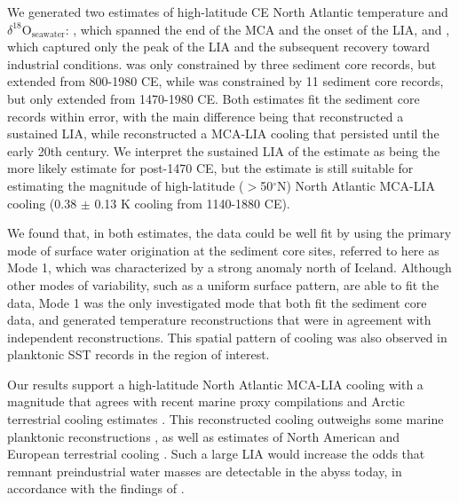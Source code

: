 \documentclass[draft]{agujournal2019}
\begin{document}
We generated two estimates of high-latitude CE North Atlantic temperature
and $\delta^{18}\mathrm{O}_{\mathrm{seawater}}$: , which
spanned the end of the MCA and the onset of the LIA, and
, which captured only the peak of the LIA and the
subsequent recovery toward industrial conditions.  was
only constrained by three sediment core records, but extended from
800-1980 CE, while  was constrained by 11 sediment core
records, but only extended from 1470-1980 CE. Both estimates fit the
sediment core records within error, with the main difference being
that  reconstructed a sustained LIA, while
 reconstructed a MCA-LIA cooling that persisted until
the early 20th century. We interpret the sustained LIA of the
 estimate as being the more likely estimate for 
post-1470 CE, but the  estimate is still suitable for
estimating the magnitude of high-latitude ($>$50$^{\circ}$N) North Atlantic
MCA-LIA cooling (0.38 $\pm$ 0.13 K cooling from 1140-1880 CE).

We found that, in both estimates, the data could be well fit by using
the primary mode of surface water origination at the sediment core
sites, referred to here as Mode 1, which was characterized by a strong
anomaly north of Iceland. Although other modes of variability, such as
a uniform surface pattern, are able to fit the data, Mode 1
was the only investigated mode that both fit the
sediment core data, and generated temperature reconstructions that
were in agreement with independent reconstructions. This spatial
pattern of cooling was also observed in planktonic SST records in the
region of interest.

Our results support a high-latitude North Atlantic MCA-LIA cooling with a magnitude
that agrees with recent marine proxy compilations \cite{ocean2k} and
Arctic terrestrial cooling estimates
\cite{Consortium--2013:Continental}. This reconstructed cooling
outweighs some marine planktonic reconstructions
\cite[]{Cunningham-Austin-2013:Reconstruction}, as well as estimates
of North American and European terrestrial cooling
\cite{Consortium--2013:Continental}. Such a large LIA would increase the odds that
remnant preindustrial water masses are detectable in the abyss today, in
accordance with the findings of .

\appendix
\end{document}
